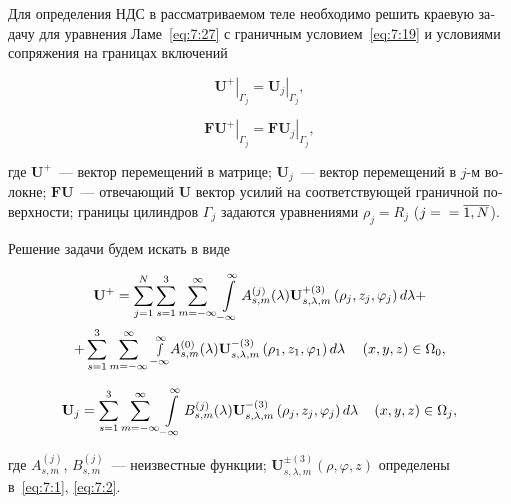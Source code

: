 \begin{russian}
Для определения НДС в рассматриваемом теле необходимо решить краевую задачу для уравнения Ламе~\eqref{eq:7:27} с граничным условием~\eqref{eq:7:19} и условиями сопряжения на границах включений

\begin{equation}
\left.\mathbf{U}^+\right|_{\Gamma_j}=\left.\mathbf{U}_j\right|_{\Gamma_j},
\label{eq:7:33}
\end{equation}

\begin{equation}
\left.\mathbf{FU}^+\right|_{\Gamma_j}=\left.\mathbf{FU}_j\right|_{\Gamma_j},
\label{eq:7:34}
\end{equation}

\noindent где $\mathbf{U}^+$~--- вектор перемещений в матрице; $\mathbf{U}_j$~--- вектор перемещений в $j$-м волокне; $\mathbf{FU}$~--- отвечающий $\mathbf{U}$ вектор усилий на соответствующей граничной поверхности; границы цилиндров $\Gamma_j$ задаются уравнениями $\rho_j=R_j$ ($j=\\=\overline{1,N}$).\par\sloppy

Решение задачи будем искать в виде

\begin{multline}
{{\bf{U}}^ + } = \sum\limits_{j = 1}^N {\sum\limits_{s = 1}^3 {\sum\limits_{m =  - \infty }^\infty  {\int\limits_{ - \infty }^\infty  {A_{s,m}^{(j)}} } } } (\lambda ){\bf{U}}_{s,\lambda ,m}^{ + (3)}\left( {{\rho _j},{z_j},{\varphi _j}} \right)d\lambda  + \\
+ \sum\limits_{s = 1}^3 {\sum\limits_{m =  - \infty }^\infty  {\mathop \smallint \limits_{ - \infty }^\infty  } } A_{s,m}^{(0)}(\lambda ){\bf{U}}_{s,\lambda ,m}^{ - (3)}\left( {{\rho _1},{z_1},{\varphi _1}} \right)d\lambda \;\;\;{\mkern 1mu} {\kern 1pt} {\kern 1pt} \left( {x,y,z} \right) \in {\Omega _0},
\end{multline}

\begin{equation}
{{\bf{U}}_j} = \sum\limits_{s = 1}^3 {\sum\limits_{m =  - \infty }^\infty  {\int\limits_{ - \infty }^\infty  {B_{s,m}^{(j)}} } } (\lambda ){\bf{U}}_{s,\lambda ,m}^{ - (3)}\left( {{\rho _j},{z_j},{\varphi _j}} \right)d\lambda \;\;\;{\mkern 1mu} {\kern 1pt} \left( {x,y,z} \right) \in {\Omega _j},
\end{equation}

\noindent где $A_{s,m}^{(j)}$, $B_{s,m}^{(j)}$~--- неизвестные функции; $\mathbf{U}_{s,\lambda,m}^{\pm(3)}(\rho,\varphi,z)$ определены в~\eqref{eq:7:1}, \eqref{eq:7:2}.


\end{russian}
